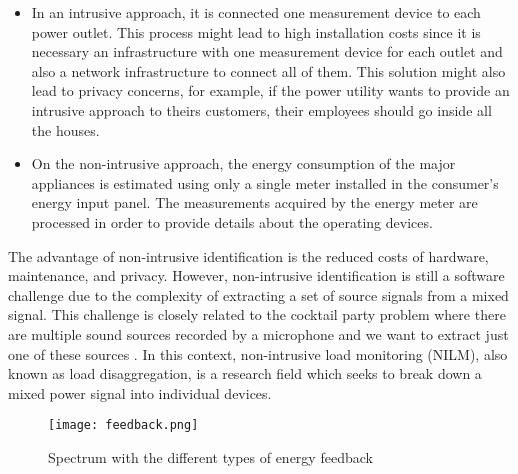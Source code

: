 \begin{itemize}
\item In an intrusive approach, it is connected one measurement device to each power outlet. This process might lead to high installation costs since it is necessary an infrastructure with one measurement device for each outlet and also a network infrastructure to connect all of them. This solution might also lead to privacy concerns, for example, if the power utility wants to provide an intrusive approach to theirs customers, their employees should go inside all the houses. 
\item On the non-intrusive approach, the energy consumption of the major appliances is estimated using only a single meter installed in the consumer’s energy input panel. The measurements acquired by the energy meter are processed in order to provide details about the operating devices.
\end{itemize}

The advantage of non-intrusive identification is the reduced costs of hardware, maintenance, and privacy. However, non-intrusive identification is still a software challenge due to the complexity of extracting a set of source signals from a mixed signal. This challenge is closely related to the cocktail party problem where there are multiple sound sources recorded by a microphone and we want to extract just one of these sources \cite{ica}. In this context, non-intrusive load monitoring (NILM), also known as load disaggregation, is a research field which seeks to break down a mixed power signal into individual devices.

\begin{figure}[tb]
    \centering
    \texttt{[image: feedback.png]}
    \caption{Spectrum with the different types of energy feedback \cite{epri}}
    \label{feedback}
\end{figure}

